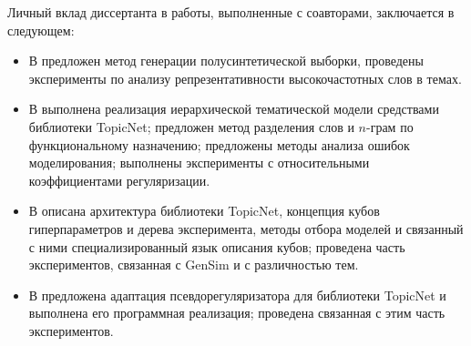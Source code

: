 {\contribution} Личный вклад диссертанта в работы, выполненные с
соавторами, заключается в следующем:
\begin{itemize}
    \item В \cite{intracoh} предложен метод генерации полусинтетической выборки, проведены эксперименты по анализу репрезентативности высокочастотных слов в темах.
    \item В \cite{popov_hier} выполнена реализация иерархической тематической модели средствами библиотеки TopicNet; предложен метод разделения слов и $n$-грам по функциональному назначению; предложены методы анализа ошибок моделирования; выполнены эксперименты с относительными коэффициентами регуляризации.
    \item В \cite{bulatov2020topicnet} описана архитектура библиотеки TopicNet, концепция кубов гиперпараметров и дерева эксперимента, методы отбора моделей и связанный с ними специализированный язык описания кубов; проведена часть экспериментов, связанная с GenSim и с различностью тем.
    \item В \cite{thetaless} предложена адаптация псевдорегуляризатора для библиотеки TopicNet и выполнена его программная реализация; проведена связанная с этим часть экспериментов.
\end{itemize}


